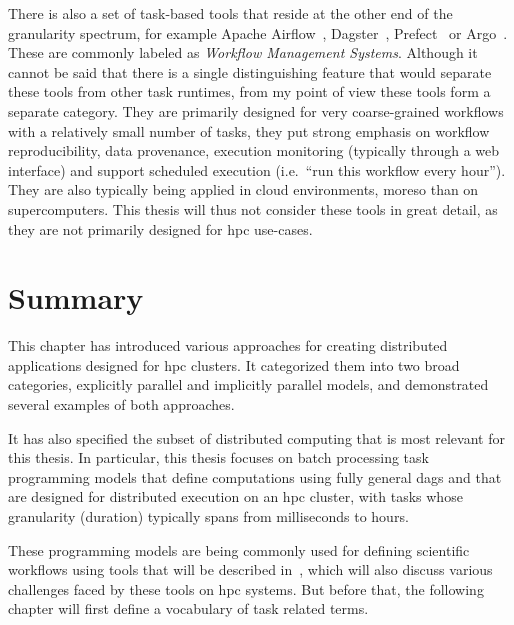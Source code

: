 There is also a set of task-based tools that reside at the other end of the granularity spectrum,
for example Apache Airflow~\cite{airfow}, Dagster~\cite{dagster},
Prefect~\cite{prefect} or Argo~\cite{argo}. These are commonly labeled as
\emph{Workflow Management Systems}. Although it cannot be said that there is a single distinguishing feature
that would separate these tools from other task runtimes, from my point of view these tools form a
separate category. They are primarily designed for very coarse-grained workflows with a relatively
small number of tasks, they put strong emphasis on workflow reproducibility, data provenance,
execution monitoring (typically through a web interface) and support scheduled execution (i.e.\
``run this workflow every hour''). They are also typically being applied in cloud environments,
moreso than on supercomputers. This thesis will thus not consider these tools in great detail, as
they are not primarily designed for \gls{hpc} use-cases.

\section*{Summary}
This chapter has introduced various approaches for creating distributed applications designed for
\gls{hpc} clusters. It categorized them into two broad categories, explicitly
parallel and implicitly parallel models, and demonstrated several examples of both approaches.

It has also specified the subset of distributed computing that is most relevant for this thesis. In
particular, this thesis focuses on batch processing task programming models that define
computations using fully general \glspl{dag} and that are designed for distributed
execution on an \gls{hpc} cluster, with tasks whose granularity (duration) typically
spans from milliseconds to hours.

These programming models are being commonly used for defining scientific workflows using tools that
will be described in~\Autoref{ch:sota}, which will also discuss various challenges faced by
these tools on \gls{hpc} systems. But before that, the following chapter will first
define a vocabulary of task related terms.
